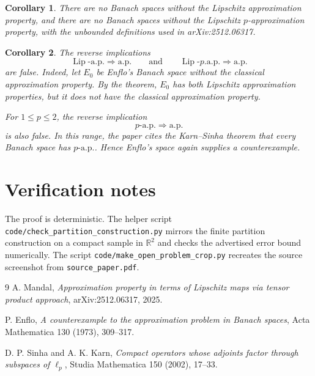 \documentclass[11pt]{article}
\newtheorem{corollary}{Corollary}
\newcommand{\Lip}{\operatorname{Lip}}
\newcommand{\ap}{\mathrm{a.p.}}
\newcommand{\pap}{p\text{-}\mathrm{a.p.}}
\begin{document}
\begin{corollary}
There are no Banach spaces without the Lipschitz approximation property, and
there are no Banach spaces without the Lipschitz $p$-approximation property,
with the unbounded definitions used in arXiv:2512.06317.
\end{corollary}

\begin{corollary}
The reverse implications
\[
        \Lip\text{-}\ap \Longrightarrow \ap
        \qquad\text{and}\qquad
        \Lip\text{-}p.\ap \Longrightarrow \ap
\]
are false. Indeed, let $E_0$ be Enflo's Banach space without the classical
approximation property. By the theorem, $E_0$ has both Lipschitz approximation
properties, but it does not have the classical approximation property.

For $1\leq p\leq2$, the reverse implication
\[
        \pap \Longrightarrow \ap
\]
is also false. In this range, the paper cites the Karn--Sinha theorem that
every Banach space has $\pap$. Hence Enflo's space again supplies a
counterexample.
\end{corollary}

\section*{Verification notes}

The proof is deterministic. The helper script
\texttt{code/check\_partition\_construction.py} mirrors the finite partition
construction on a compact sample in $\mathbb R^2$ and checks the advertised
error bound numerically. The script \texttt{code/make\_open\_problem\_crop.py}
recreates the source screenshot from \texttt{source\_paper.pdf}.

\begin{thebibliography}{9}
A. Mandal,
\emph{Approximation property in terms of Lipschitz maps via tensor product approach},
arXiv:2512.06317, 2025.

P. Enflo,
\emph{A counterexample to the approximation problem in Banach spaces},
Acta Mathematica 130 (1973), 309--317.

D. P. Sinha and A. K. Karn,
\emph{Compact operators whose adjoints factor through subspaces of $\ell_p$},
Studia Mathematica 150 (2002), 17--33.
\end{thebibliography}
\end{document}
